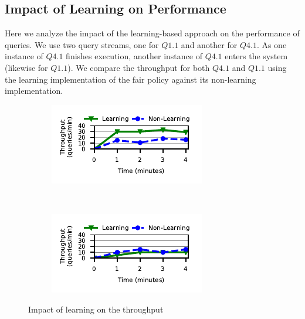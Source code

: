 \subsection{Impact of Learning on Performance}\label{ssec:learning-impact-perf}
Here we analyze the impact of the learning-based approach on the performance of queries. 
We use two query streams, one for $Q1.1$ and another for $Q4.1$.
As one instance of $Q4.1$ finishes execution, another instance of $Q4.1$ enters the system (likewise for $Q1.1$).
We compare the throughput for both $Q4.1$ and $Q1.1$ using the learning implementation of the fair policy against its non-learning implementation.

\begin{figure}[ht]
	\centering
	\begin{subfigure}[b]{0.5\textwidth}
		\includegraphics[width=\textwidth]{policy/figures/q11-throughput.pdf}
	\end{subfigure}%
	~
	\begin{subfigure}[b]{0.5\textwidth}
		\includegraphics[width=\textwidth]{policy/figures/q41-throughput.pdf}
	\end{subfigure}%
	\caption{Impact of learning on the throughput}
	\label{fig:q11-q41-throughput}
\end{figure}

